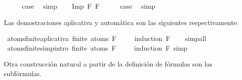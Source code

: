 \begin{isabellebody}
\ \ \isamarkupfalse%
\ \isamarkupfalse%
\ {\isacharquery}case\ \isamarkupfalse%
\ simp\isanewline
{}\isamarkupfalse%
\isanewline
\ \ \isamarkupfalse%
\ {\isacharparenleft}Imp\ F{}\ F{}{\isacharparenright}\isanewline
\ \ \isamarkupfalse%
\ \isamarkupfalse%
\ {\isacharquery}case\ \isamarkupfalse%
\ simp\isanewline
{}\isamarkupfalse%
%
\endisatagproof
{\isafoldproof}%
%
\isadelimproof
%
\endisadelimproof
%
\begin{isamarkuptext}%
Las demostraciones aplicativa y automática son las siguientes respectivamente.%
\end{isamarkuptext}\isamarkuptrue%
\isamarkupfalse%
\ atoms{\isacharunderscore}finite{\isacharunderscore}aplicativa{\isacharcolon}\ {\isachardoublequoteopen}finite\ {\isacharparenleft}atoms\ F{\isacharparenright}{\isachardoublequoteclose}\ \isanewline
%
\isadelimproof
\ \ %
\endisadelimproof
%
\isatagproof
{}\isamarkupfalse%
\ {\isacharparenleft}induction\ F{\isacharparenright}\isanewline
\ \ \isamarkupfalse%
\ simp{\isacharunderscore}all\isanewline
\ \isamarkupfalse%
%
\endisatagproof
{\isafoldproof}%
%
\isadelimproof
\isanewline
%
\endisadelimproof
\isanewline
{}\isamarkupfalse%
\ atoms{\isacharunderscore}finite{\isacharbrackleft}simp{\isacharcomma}intro{\isacharbang}{\isacharbrackright}{\isacharcolon}\ {\isachardoublequoteopen}finite\ {\isacharparenleft}atoms\ F{\isacharparenright}{\isachardoublequoteclose}\ \isanewline
%
\isadelimproof
\ \ %
\endisadelimproof
%
\isatagproof
{}\isamarkupfalse%
\ {\isacharparenleft}induction\ F{\isacharsemicolon}\ simp{\isacharparenright}%
\endisatagproof
{\isafoldproof}%
%
\isadelimproof
%
\endisadelimproof
%
\isadelimdocument
%
\endisadelimdocument
%
\isatagdocument
%
\isamarkuptrue%
%
\endisatagdocument
{\isafolddocument}%
%
\isadelimdocument
%
\endisadelimdocument
%
\begin{isamarkuptext}%
Otra construcción natural a partir de la definición de fórmulas son las subfórmulas.


\end{isamarkuptext}
\end{isabellebody}
